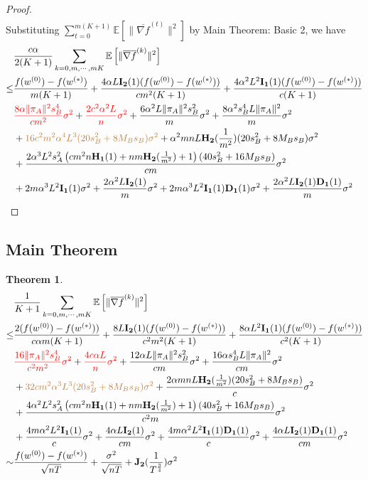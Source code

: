 \documentclass{article}
\newtheorem{theorem}{Theorem}
\newcommand{\EE}[1]{\mathbb{E}\left[#1\right]}
\newcommand{\norm}[1]{\| #1 \|}
\begin{document}
\begin{proof}
\begin{align*}
  \end{align*}
  Substituting $\sum_{t=0}^{m(K+1)}\EE{\norm{\overline{\nabla f}^{(t)}}^2}$ by Main Theorem: Basic 2, we have
  \begin{align*}
    &\frac{c\alpha }{2(K+1)}\sum_{k=0,m,\cdots,mK}\EE{\norm{\overline{\nabla f}^{(k)}}^2}
  \\\leq& \frac{f(w^{(0)})-f(w^{(*)})}{m(K+1)}+\frac{4\alpha L\mathbf{I_2}(1)(f(w^{(0)})- f(w^{(*)}))}{cm^2(K+1)}+\frac{4\alpha^2L^2\mathbf{I_1}(1)( f(w^{(0)})- f(w^{(*)}))}{c(K+1)}
  \\&\textcolor{red}{\frac{8\alpha \norm{\pi_A}^2s_B^4}{cm^2}\sigma^2}+\textcolor{red}{ \frac{2c^2\alpha^2L}{n}\sigma^2}+\frac{6\alpha^2L\norm{\pi_A}^2s_B^2}{m}\sigma^2+\frac{8\alpha^2s_B^4L\norm{\pi_A}^2}{m}\sigma^2\\&+\textcolor{brown}{16c^2m^2\alpha^4L^3(20s_B^2+8M_Bs_B)\sigma^2}+\alpha^2 mnL \mathbf{H_2}(\frac{1}{m^2})(20s_B^2+8M_Bs_B)\sigma^2\\ &+\frac{2\alpha^3 L^2s_A^2\left(cm^2n\mathbf{H_1}(1)+nm\mathbf{H_2}(\frac{1}{m^2})+1\right)(40s_B^2+16M_Bs_B)}{cm}\sigma^2\\&+2m\alpha^3L^2\mathbf{I_1}(1)\sigma^2+\frac{2\alpha^2L\mathbf{I_2}(1)}{m}\sigma^2
  +2m\alpha^3L^2\mathbf{I_1}(1)\mathbf{D_1}(1)\sigma^2
  +\frac{2\alpha^2L\mathbf{I_2}(1)\mathbf{D_1}(1)}{m}\sigma^2
  \end{align*} 
\end{proof}

\subsection{Main Theorem}
\begin{theorem}
  \begin{align*}
    &\frac{1 }{K+1}\sum_{k=0,m,\cdots,mK}\EE{\norm{\overline{\nabla f}^{(k)}}^2}
  \\\leq& \frac{2(f(w^{(0)})-f(w^{(*)}))}{c\alpha m(K+1)}+\frac{8L\mathbf{I_2}(1)(f(w^{(0)})- f(w^{(*)}))}{c^2m^2(K+1)}+\frac{8\alpha L^2\mathbf{I_1}(1)( f(w^{(0)})- f(w^{(*)}))}{c^2(K+1)}
  \\&\textcolor{red}{\frac{16 \norm{\pi_A}^2s_B^4}{c^2m^2}\sigma^2}+\textcolor{red}{ \frac{4c\alpha L}{n}\sigma^2}+\frac{12\alpha L\norm{\pi_A}^2s_B^2}{cm}\sigma^2+\frac{16\alpha s_B^4L\norm{\pi_A}^2}{cm}\sigma^2\\&+\textcolor{brown}{32cm^2\alpha^3L^3(20s_B^2+8M_Bs_B)\sigma^2}+\frac{2\alpha mnL \mathbf{H_2}(\frac{1}{m^2})(20s_B^2+8M_Bs_B)}{c}\sigma^2\\ &+\frac{4\alpha^2 L^2s_A^2\left(cm^2n\mathbf{H_1}(1)+nm\mathbf{H_2}(\frac{1}{m^2})+1\right)(40s_B^2+16M_Bs_B)}{c^2m}\sigma^2\\&+\frac{4m\alpha^2L^2\mathbf{I_1}(1)}{c}\sigma^2+\frac{4\alpha L\mathbf{I_2}(1)}{cm}\sigma^2
  +\frac{4m\alpha^2L^2\mathbf{I_1}(1)\mathbf{D_1}(1)}{c}\sigma^2
  +\frac{4\alpha L\mathbf{I_2}(1)\mathbf{D_1}(1)}{cm}\sigma^2
  \\\sim & \frac{f(w^{(0)})-f(w^{(*)})}{\sqrt{nT}}+\frac{\sigma^2}{\sqrt{nT}}+\mathbf{J_2}(\frac{1}{T^{\frac{3}{4}}})\sigma^2
  \end{align*}
\end{theorem}
\end{document}
